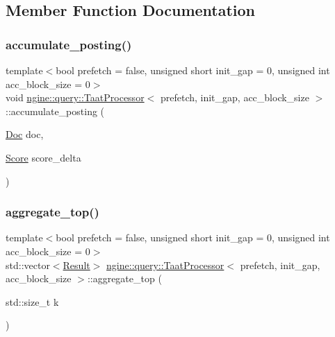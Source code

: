 \subsection{Member Function Documentation}
\mbox{\label{classngine_1_1query_1_1TaatProcessor_aa5b4f79585c4f2726d5c311944e0a290}} 
\subsubsection{\texorpdfstring{accumulate\+\_\+posting()}{accumulate\_posting()}}
{\footnotesize\ttfamily template$<$bool prefetch = false, unsigned short init\+\_\+gap = 0, unsigned int acc\+\_\+block\+\_\+size = 0$>$ \\
void \hyperlink{classngine_1_1query_1_1TaatProcessor}{ngine\+::query\+::\+Taat\+Processor}$<$ prefetch, init\+\_\+gap, acc\+\_\+block\+\_\+size $>$\+::accumulate\+\_\+posting (\begin{DoxyParamCaption}\item[{\hyperlink{structngine_1_1Doc}{Doc}}]{doc,  }\item[{\hyperlink{structngine_1_1Score}{Score}}]{score\+\_\+delta }\end{DoxyParamCaption})\hspace{0.3cm}{\ttfamily [inline]}}

\mbox{\label{classngine_1_1query_1_1TaatProcessor_a567261dd90dbc6fc3b23d55e77fd67d0}} 
\subsubsection{\texorpdfstring{aggregate\+\_\+top()}{aggregate\_top()}}
{\footnotesize\ttfamily template$<$bool prefetch = false, unsigned short init\+\_\+gap = 0, unsigned int acc\+\_\+block\+\_\+size = 0$>$ \\
std\+::vector$<$\hyperlink{structngine_1_1query_1_1Result}{Result}$>$ \hyperlink{classngine_1_1query_1_1TaatProcessor}{ngine\+::query\+::\+Taat\+Processor}$<$ prefetch, init\+\_\+gap, acc\+\_\+block\+\_\+size $>$\+::aggregate\+\_\+top (\begin{DoxyParamCaption}\item[{std\+::size\+\_\+t}]{k }\end{DoxyParamCaption})\hspace{0.3cm}{\ttfamily [inline]}}

